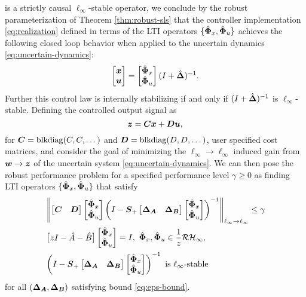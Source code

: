 is a strictly causal $\ell_\infty$-stable operator, we conclude by the robust parameterization of Theorem \ref{thm:robust-sls} that the controller implementation \eqref{eq:realization} defined in terms of the LTI operators $\{\hat{\boldsymbol{\Phi}}_x,\hat{\boldsymbol{\Phi}}_u\}$ achieves the following closed loop behavior when applied to the uncertain dynamics \eqref{eq:uncertain-dynamics}:
\begin{equation}
\begin{bmatrix}\boldsymbol{x} \\ \boldsymbol{u} \end{bmatrix} = \begin{bmatrix} \hat{\boldsymbol{\Phi}}_x \\ \hat{\boldsymbol{\Phi}}_u \end{bmatrix}(I+\hat{\boldsymbol{\Delta}})^{-1}.
\end{equation}
Further this control law is internally stabilizing if and only if $(I+\hat{\boldsymbol{\Delta}})^{-1}$ is $\ell_\infty$-stable.  
Defining the controlled output signal as 
\begin{equation}
\boldsymbol{z} = \boldsymbol{C}\boldsymbol{x} + \boldsymbol{D}\boldsymbol{u},
\end{equation}
for $\boldsymbol{C} = \mathrm{blkdiag}(C,C,\dots)$ and $\boldsymbol{D} = \mathrm{blkdiag}(D,D,\dots)$, user specified cost matrices, and consider the goal of minimizing the $\ell_\infty\to\ell_\infty$ induced gain from $\boldsymbol{w} \to \boldsymbol{z}$ of the uncertain system \eqref{eq:uncertain-dynamics}.  We can then pose the robust performance problem for a specified performance level $\gamma \geq 0$ as finding LTI operators $\{\hat{\boldsymbol{\Phi}}_x,\hat{\boldsymbol{\Phi}}_u\}$ that satisfy 
\begin{equation}\label{eq:robust-perf1}
\begin{aligned}
& \linffnorm{\begin{bmatrix} \tf C & \tf D \end{bmatrix} \begin{bmatrix} \Phixh \\ \Phiuh \end{bmatrix} \left(I-\Sp\begin{bmatrix} \DA & \DB \end{bmatrix}\begin{bmatrix} \Phixh \\ \Phiuh \end{bmatrix}\right)^{-1} } \leq \gamma \\
& \begin{bmatrix} zI - \hat A   - \hat B \end{bmatrix}\begin{bmatrix} \Phixh \\ \Phiuh \end{bmatrix} = I,\ \Phixh, \Phiuh \in \frac{1}{z}\RHinf, \\
& \left(I-\Sp\begin{bmatrix} \DA & \DB \end{bmatrix}\begin{bmatrix} \Phixh \\ \Phiuh \end{bmatrix}\right)^{-1} \text{ is $\ell_\infty$-stable}
\end{aligned}
\end{equation}
for all $({\boldsymbol{\Delta}}_{\boldsymbol{A}},{\boldsymbol{\Delta}}_{\boldsymbol{B}})$ satisfying bound \eqref{eq:eps-bound}.

